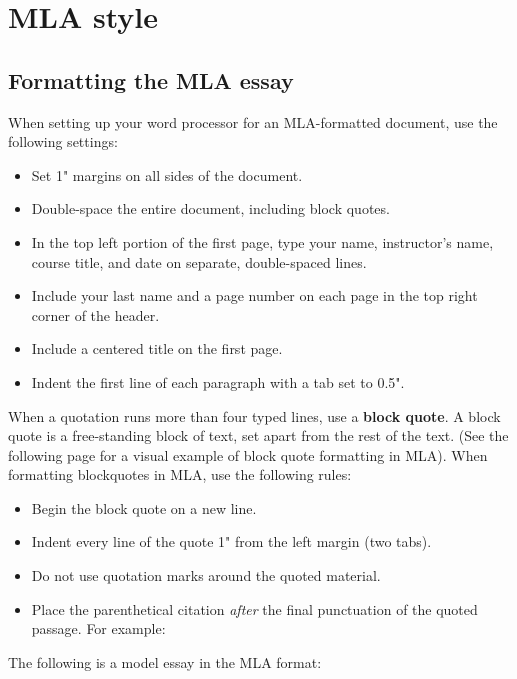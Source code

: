 
\chapter{MLA style} %


\section{Formatting the MLA essay}
When setting up your word processor for an MLA-formatted document, use the 
following settings:

\begin{itemize}
\item Set 1" margins on all sides of the document.
\item Double-space the entire document, including block quotes.
\item In the top left portion of the first page, type your name, instructor's name, 
course title, and date on separate, double-spaced lines.
\item Include your last name and a page number on each page in the top right corner 
of the header.
\item Include a centered title on the first page.
\item Indent the first line of each paragraph with a tab set to 0.5".
\end{itemize}

When a quotation runs more than four typed lines, use a \textbf{block quote}. A block 
quote is a free-standing block of text, set apart from the rest of the text. (See the 
following page for a visual example of block quote formatting in MLA). When formatting 
blockquotes in MLA, use the following rules: 

\begin{itemize}
\item Begin the block quote on a new line. 
\item Indent every line of the quote 1" from the left margin (two tabs). 
\item Do not use quotation marks around the quoted material. 
\item Place the parenthetical citation \emph{after} the final punctuation of the quoted 
passage. For example:
\end{itemize}

The following is a model essay in the MLA format:


